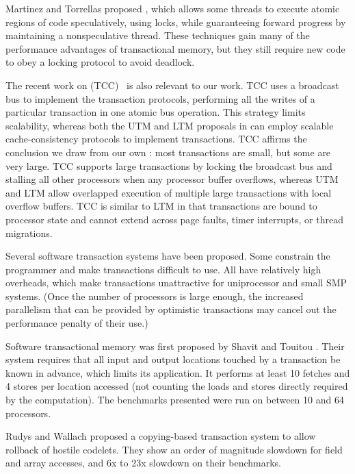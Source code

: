 Martinez and Torrellas proposed 
\cite{MartinezTo02}, which allows some threads to execute atomic
regions of code speculatively, using locks, while guaranteeing forward
progress by maintaining a nonspeculative thread.  These techniques
gain many of the performance advantages of transactional memory, but
they still require new code to obey a locking protocol to avoid
deadlock.

The recent work on  (TCC)~\cite{HammondWoCh04} is also relevant to our work.
TCC uses a broadcast bus to implement the transaction protocols,
performing all the writes of a particular transaction in one atomic
bus operation.  This strategy limits scalability, whereas both the UTM and
LTM proposals in 
can employ scalable cache-consistency protocols to implement
transactions.  TCC affirms the conclusion we draw from our own
: most transactions are small, but some are very large.  TCC
supports large transactions by locking the broadcast bus and stalling
all other processors when any processor buffer overflows, whereas UTM
and LTM allow overlapped execution of multiple large transactions with
local overflow buffers.  TCC is similar to LTM in that transactions
are bound to processor state and cannot extend across page faults,
timer interrupts, or thread migrations.


Several software transaction systems have been proposed.  Some constrain the
programmer and make transactions difficult to use.  All have
relatively high overheads, which make transactions unattractive for
uniprocessor and small SMP systems. (Once the number of processors is
large enough, the increased parallelism that can be provided by
optimistic transactions may cancel out the performance penalty of
their use.)

Software transactional memory was first proposed by
Shavit and Touitou \cite{ShavitTo95}.  Their system requires that all
input and output locations touched by a transaction be known in
advance, which limits its application.  It performs at least 10
fetches and 4 stores per location accessed (not counting the loads and
stores directly required by the computation).  The benchmarks
presented were run on between 10 and 64 processors.

Rudys and Wallach \cite{RudysWa02} proposed a copying-based
transaction system to allow rollback of hostile codelets.
They show an order of magnitude slowdown for field and array
accesses, and 6x to 23x slowdown on their benchmarks.

